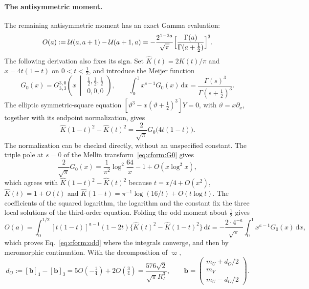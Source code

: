 \documentclass[11pt,a4paper]{article}
\numberwithin{equation}{section}
\newcommand{\dd}{\,\mathrm d}
\begin{document}
\paragraph{The antisymmetric moment.} The remaining antisymmetric moment has an exact Gamma evaluation:
\begin{equation}
 O(a):=\mathcal U(a,a+1)-\mathcal U(a+1,a)=-\frac{2^{1-2a}}{\sqrt\pi}\Bigl[\frac{\Gamma(a)}{\Gamma(a+\frac12)}\Bigr]^3.
 \label{eq:cform:odd}
\end{equation}
The following derivation also fixes its sign. Set $\hat K(t)=2K(t)/\pi$ and $x=4t(1-t)$ on $0<t<\frac12$, and
introduce the Meijer function
\begin{equation}
 G_0(x)=G^{3,0}_{3,3}\!\left(x\,\middle|\,\begin{matrix}\frac12,\frac12,\frac12\\0,0,0\end{matrix}\right),\qquad
 \int_0^1x^{s-1}G_0(x)\dd x=\frac{\Gamma(s)^3}{\Gamma(s+\frac12)^3}.
 \label{eq:cform:G0}
\end{equation}
The elliptic symmetric-square equation $[\vartheta^3-x(\vartheta+\frac12)^3]Y=0$, with $\vartheta=x\partial_x$, together
with its endpoint normalization, gives
\begin{equation}
 \hat K(1-t)^2-\hat K(t)^2=\frac2{\sqrt\pi}G_0\bigl(4t(1-t)\bigr).
 \label{eq:cform:compdiff}
\end{equation}
The normalization can be checked directly, without an unspecified constant. The triple pole at $s=0$ of the Mellin
transform~\eqref{eq:cform:G0} gives
\begin{equation}
 \frac2{\sqrt\pi}G_0(x)=\frac1{\pi^2}\log^2\frac{64}{x}-1+O(x\log^2x),
\end{equation}
which agrees with $\hat K(1-t)^2-\hat K(t)^2$ because $t=x/4+O(x^2)$, $\hat K(t)=1+O(t)$ and
$\hat K(1-t)=\pi^{-1}\log(16/t)+O(t\log t)$. The coefficients of the squared logarithm, the logarithm and the constant
fix the three local solutions of the third-order equation. Folding the odd moment about $\frac12$ gives
\begin{equation}
 O(a)=\int_0^{1/2}[t(1-t)]^{a-1}(1-2t)\bigl\{\hat K(t)^2-\hat K(1-t)^2\bigr\}\dd t
 =-\frac{2\cdot4^{-a}}{\sqrt\pi}\int_0^1x^{a-1}G_0(x)\dd x,
\end{equation}
which proves Eq.~\eqref{eq:cform:odd} where the integrals converge, and then by meromorphic continuation. With the
decomposition of $\varpi$,
\begin{equation}
 d_O:=[\mathbf b]_1-[\mathbf b]_3=5O(-\tfrac14)+2O(\tfrac34)=\frac{576\sqrt2}{\sqrt\pi R_\Gamma^3},\qquad
 \mathbf b=\begin{pmatrix}m_U+d_O/2\\m_V\\m_U-d_O/2\end{pmatrix}.
\end{equation}
\end{document}
